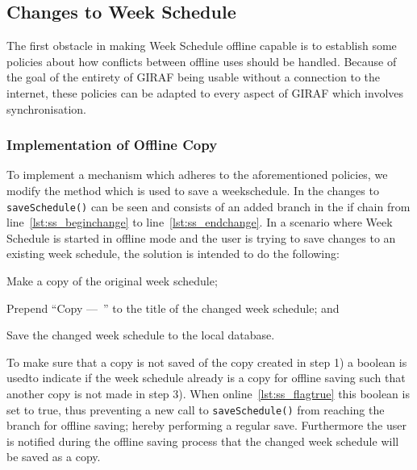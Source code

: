 \subsection{Changes to Week Schedule}
The first obstacle in making Week Schedule offline capable is to establish some policies about how conflicts between offline uses should be handled.
Because of the goal of the entirety of GIRAF being usable without a connection to the internet, these policies can be adapted to every aspect of GIRAF which involves synchronisation.



\subsubsection{Implementation of Offline Copy}
To implement a mechanism which adheres to the aforementioned policies, we modify the method which is used to save a weekschedule.
In  the changes to \texttt{saveSchedule()} can be seen and consists of an added branch in the if chain from line~\ref{lst:ss_beginchange} to line~\ref{lst:ss_endchange}.
In a scenario where Week Schedule is started in offline mode and the user is trying to save changes to an existing week schedule, the solution is intended to do the following: 
\begin{enumberate}
\item Make a copy of the original week schedule;
\item Prepend \enquote{Copy ---~} to the title of the changed week schedule; and
\item Save the changed week schedule to the local database.  
\end{enumberate}

To make sure that a copy is not saved of the copy created in step 1) a boolean is usedto indicate if the week schedule already is a copy for offline saving such that another copy is not made in step 3).
When online~\ref{lst:ss_flagtrue} this boolean is set to true, thus preventing a new call to \texttt{saveSchedule()} from reaching the branch for offline saving; hereby performing a regular save.
Furthermore the user is notified during the offline saving process that the changed week schedule will be saved as a copy.

